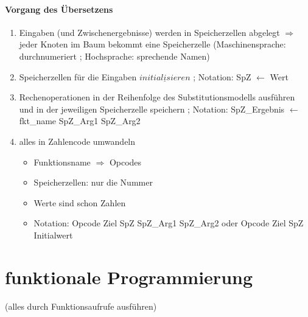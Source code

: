 \documentclass{article}
\begin{document}
		\paragraph{Vorgang des Übersetzens}
		\begin{enumerate}
			\item Eingaben (und Zwischenergebnisse) werden in Speicherzellen abgelegt $ \Rightarrow$ jeder Knoten im Baum bekommt eine Speicherzelle (Maschinensprache: durchnumeriert ; Hochsprache: sprechende Namen)
			\item Speicherzellen für die Eingaben $\underline{initialisieren}$ ; Notation: SpZ $\leftarrow$ Wert
			\item Rechenoperationen in der Reihenfolge des Substitutionsmodells ausführen und in der jeweiligen Speicherzelle speichern ; Notation: SpZ\_Ergebnis $\leftarrow$ fkt\_name SpZ\_Arg1 SpZ\_Arg2
			\item alles in Zahlencode umwandeln
			\begin{itemize}
				\item Funktionsname $\Rightarrow$ Opcodes
				\item Speicherzellen: nur die Nummer
				\item Werte sind schon Zahlen
				\item Notation: Opcode \quad Ziel SpZ \quad SpZ\_Arg1 \quad SpZ\_Arg2 oder Opcode \quad Ziel SpZ \quad Initialwert
			\end{itemize}
		\end{enumerate}
	
	\section{funktionale Programmierung}
	(alles durch Funktionsaufrufe ausführen)
	
\end{document}
